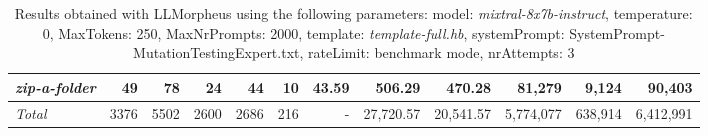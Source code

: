 \begin{table*}
{\begin{tabular}{l||r|r|r|r|r|r||r|r||r|r|r}
   \hline
   \textit{zip-a-folder} & 49 & 78 & 24 & 44 & 10 & 43.59 & 506.29 & 470.28 & 81,279 & 9,124 & 90,403 \\ 
   \hline
   \textit{Total} & 3376 & 5502 & 2600 & 2686 & 216 & - & 27,720.57  & 20,541.57 & 5,774,077 & 638,914 & 6,412,991 \\ 
 \end{tabular}
 }
 \caption{Results obtained with LLMorpheus using the following parameters: 
   model: \textit{mixtral-8x7b-instruct}, 
   temperature: 0, 
   MaxTokens: 250, 
   MaxNrPrompts: 2000, 
   template: \textit{template-full.hb}, 
   systemPrompt: SystemPrompt-MutationTestingExpert.txt, 
   rateLimit: benchmark mode, 
   nrAttempts: 3  
 }
\end{table*}

